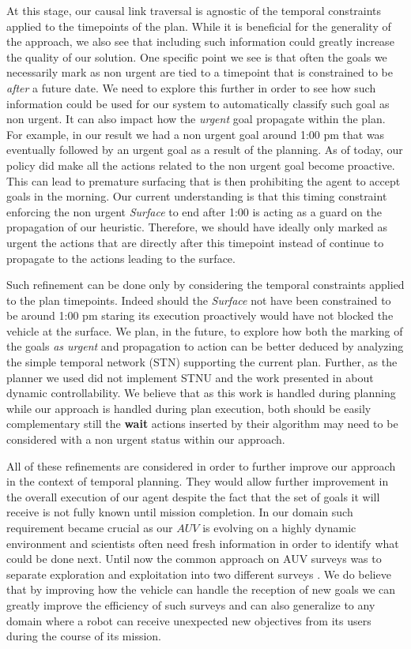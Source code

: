At this stage, our causal link traversal is agnostic of the temporal 
constraints applied to the timepoints of the plan. While it is
beneficial for the generality of the approach, we also see that
including such information could greatly increase the quality of our solution. 
One specific point we see is that often the goals we necessarily mark
as non urgent are tied to a timepoint that is constrained to be {\em
  after} a future date. We need to explore this further in order to
see how such information could be used for our system to automatically
classify such goal as non urgent. It can also impact how the
{\em urgent} goal propagate within the plan. For example, in our result
we had a non urgent goal around 1:00 pm that was eventually 
followed by an urgent goal as a result of the planning. As of today, 
our policy did make all the actions related to the non urgent goal 
become proactive. This can lead to premature surfacing that is then 
prohibiting the agent to accept goals in the morning. Our current
understanding is that this timing constraint enforcing the non
urgent {\em Surface} to end after 1:00 is acting as a guard on the
propagation of our heuristic. Therefore, we should have ideally only
marked as urgent the actions that are directly after this timepoint
instead of continue to propagate to the actions leading to the
surface. 

Such refinement can be done only by considering the temporal
constraints applied to the plan timepoints. Indeed should the 
{\em Surface} not have been constrained to be around 1:00 pm staring
its execution proactively would have not blocked the vehicle at the
surface. We plan, in the future, to explore how both the
marking of the goals {\em as urgent} and propagation to action can be
better deduced by analyzing the simple temporal network (STN)
supporting the current plan. Further, as the planner we used did not
implement STNU and the work presented in \cite{morris01} about dynamic
controllability. We believe that as this work is handled during
planning while our approach is handled during plan execution, both
should be easily complementary still the {\bf wait} actions inserted
by their algorithm may need to be considered with a non
urgent status within our approach. 

All of these refinements are considered in order to further improve
our approach in the context of temporal planning. They would allow
further improvement in the overall execution of our agent despite the fact
that the set of goals it will receive is not fully known until mission 
completion. In our domain such requirement became crucial as our $AUV$
is evolving on a highly dynamic environment and scientists often need
fresh information in order to identify what could be done next. Until
now the common approach on AUV surveys was to separate exploration and
exploitation into two different surveys \cite{Yoerger01012007}. We do
believe that by improving how the vehicle can handle the reception of
new goals we can greatly improve the efficiency of such surveys and can
also generalize to any domain where a robot can receive unexpected
new objectives from its users during the course of its mission.





